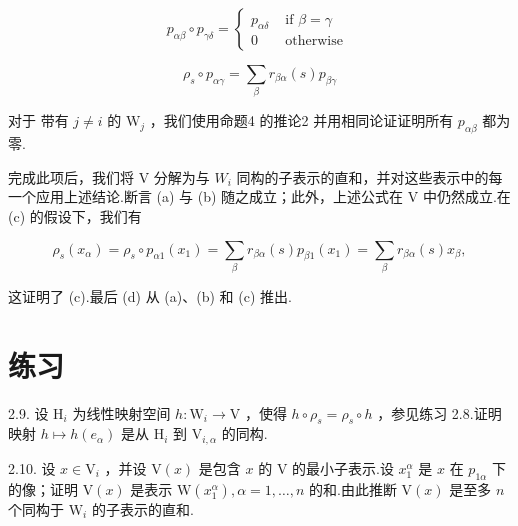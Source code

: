 \[
{p}_{\alpha \beta } \circ  {p}_{\gamma \delta } = \left\{  \begin{array}{ll} {p}_{\alpha \delta } & \text{ if }\beta  = \gamma \\  0 & \text{ otherwise } \end{array}\right.
\]

\[
{\rho }_{s} \circ  {p}_{\alpha \gamma } = \mathop{\sum }\limits_{\beta }{r}_{\beta \alpha }\left( s\right) {p}_{\beta \gamma }
\]

对于 带有 \(j \neq  i\) 的 \({\mathrm{W}}_{j}\) ，我们使用命题4 的推论2 并用相同论证证明所有 \({p}_{\alpha \beta }\) 都为零.

完成此项后，我们将 V 分解为与 \({W}_{i}\) 同构的子表示的直和，并对这些表示中的每一个应用上述结论.断言 (a) 与 (b) 随之成立；此外，上述公式在 V 中仍然成立.在 (c) 的假设下，我们有

\[
{\rho }_{s}\left( {x}_{\alpha }\right)  = {\rho }_{s} \circ  {p}_{\alpha 1}\left( {x}_{1}\right)  = \mathop{\sum }\limits_{\beta }{r}_{\beta \alpha }\left( s\right) {p}_{\beta 1}\left( {x}_{1}\right)  = \mathop{\sum }\limits_{\beta }{r}_{\beta \alpha }\left( s\right) {x}_{\beta },
\]

这证明了 (c).最后 (d) 从 (a)、(b) 和 (c) 推出.

\section*{练习}

2.9. 设 \({\mathrm{H}}_{i}\) 为线性映射空间 \(h : {\mathrm{W}}_{i} \rightarrow  \mathrm{V}\) ，使得 \(h \circ  {\rho }_{s} = {\rho }_{s} \circ  h\) ，参见练习 2.8.证明映射 \(h \mapsto  h\left( {e}_{\alpha }\right)\) 是从 \({\mathrm{H}}_{i}\) 到 \({\mathrm{V}}_{i,\alpha }\) 的同构.

2.10. 设 \(x \in  {\mathrm{V}}_{i}\) ，并设 \(\mathrm{V}\left( x\right)\) 是包含 \(x\) 的 \(\mathrm{V}\) 的最小子表示.设 \({x}_{1}^{\alpha }\) 是 \(x\) 在 \({p}_{1\alpha }\) 下的像；证明 \(\mathrm{V}\left( x\right)\) 是表示 \(\mathrm{W}\left( {x}_{1}^{\alpha }\right) ,\alpha  = 1,\ldots ,n\) 的和.由此推断 \(\mathrm{V}\left( x\right)\) 是至多 \(n\) 个同构于 \({\mathrm{W}}_{i}\) 的子表示的直和.
